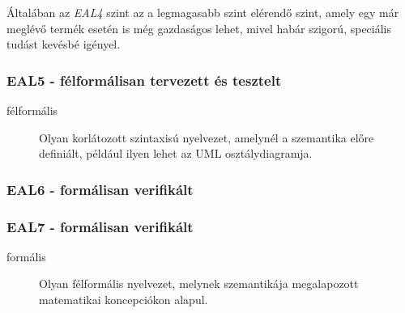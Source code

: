 Általában az \emph{EAL4} szint az a legmagasabb szint elérendő szint, amely egy már meglévő termék
esetén is még gazdaságos lehet, mivel habár szigorú, speciális tudást kevésbé igényel.

\subsubsection{EAL5 - félformálisan tervezett és tesztelt}
\begin{description}
    \item[félformális]{Olyan korlátozott szintaxisú nyelvezet, amelynél a szemantika előre
        definiált, például ilyen lehet az UML osztálydiagramja.}
\end{description}
\subsubsection{EAL6 - formálisan verifikált}
\subsubsection{EAL7 - formálisan verifikált}
\begin{description}
    \item[formális]{Olyan félformális nyelvezet, melynek szemantikája megalapozott matematikai
        koncepciókon alapul.}
\end{description}

